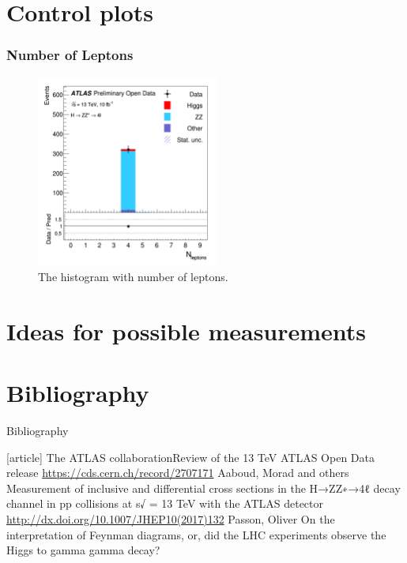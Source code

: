 \documentclass[aspectratio=1610, english]{beamer}
\begin{document}
\section{Control plots}

\begin{frame}
\frametitle{Number of Leptons}

\begin{figure} [H]
\centering
\includegraphics[width=6cm]{hist_n_lept.png}
\caption{The histogram with number of leptons. }
\end{figure}

\end{frame}

\section{Ideas for possible measurements}

\section{Bibliography}
\begin{frame}[allowframebreaks]{Bibliography}
	\begin{thebibliography}{9}
		[article]
			{The ATLAS collaboration\newblock Review of the 13 TeV ATLAS Open Data release \newblock \url{https://cds.cern.ch/record/2707171}}
			{Aaboud, Morad and others \newblock Measurement of inclusive and differential cross sections in the H→ZZ∗→4ℓ decay channel in pp collisions at s√ = 13 TeV with the ATLAS detector \newblock \url{http://dx.doi.org/10.1007/JHEP10(2017)132}}
			{Passon, Oliver \newblock On the interpretation of Feynman diagrams, or, did the LHC experiments observe the Higgs to gamma gamma decay?}
	\end{thebibliography}
\end{frame}
\end{document}
